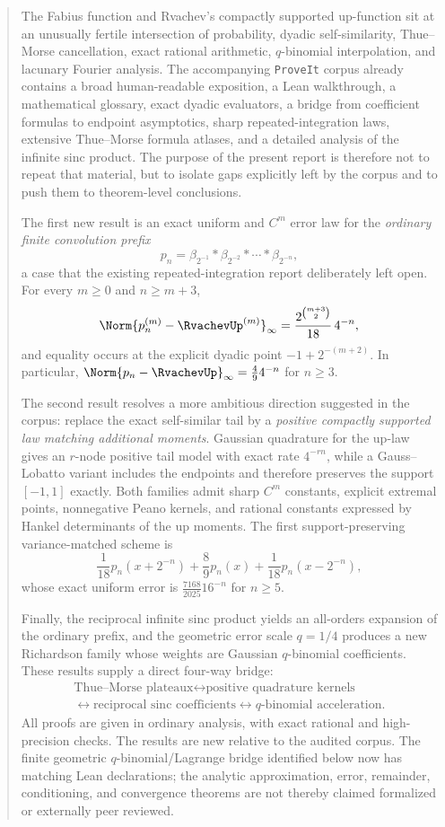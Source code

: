 \documentclass[11pt]{article}
\numberwithin{equation}{section}
\theoremstyle{definition}
\theoremstyle{remark}
\begin{document}
\begin{abstract}
The Fabius function and Rvachev's compactly supported up-function sit at an unusually fertile intersection of probability, dyadic self-similarity, Thue--Morse cancellation, exact rational arithmetic, $q$-binomial interpolation, and lacunary Fourier analysis.  The accompanying \texttt{ProveIt} corpus already contains a broad human-readable exposition, a Lean walkthrough, a mathematical glossary, exact dyadic evaluators, a bridge from coefficient formulas to endpoint asymptotics, sharp repeated-integration laws, extensive Thue--Morse formula atlases, and a detailed analysis of the infinite sinc product.  The purpose of the present report is therefore not to repeat that material, but to isolate gaps explicitly left by the corpus and to push them to theorem-level conclusions.

The first new result is an exact uniform and $C^m$ error law for the \emph{ordinary finite convolution prefix}
\[
 p_n=\beta_{2^{-1}}*\beta_{2^{-2}}*\cdots*\beta_{2^{-n}},
\]
a case that the existing repeated-integration report deliberately left open.  For every $m\ge0$ and $n\ge m+3$,
\[
 \Norm{p_n^{(m)}-\RvachevUp^{(m)}}_\infty
 =\frac{2^{\binom{m+3}{2}}}{18}\,4^{-n},
\]
and equality occurs at the explicit dyadic point $-1+2^{-(m+2)}$.  In particular,
\(\Norm{p_n-\RvachevUp}_\infty=\frac49 4^{-n}\) for $n\ge3$.

The second result resolves a more ambitious direction suggested in the corpus: replace the exact self-similar tail by a \emph{positive compactly supported law matching additional moments}.  Gaussian quadrature for the up-law gives an $r$-node positive tail model with exact rate $4^{-rn}$, while a Gauss--Lobatto variant includes the endpoints and therefore preserves the support $[-1,1]$ exactly.  Both families admit sharp $C^m$ constants, explicit extremal points, nonnegative Peano kernels, and rational constants expressed by Hankel determinants of the up moments.  The first support-preserving variance-matched scheme is
\[
 \frac1{18}p_n(x+2^{-n})+\frac89p_n(x)+\frac1{18}p_n(x-2^{-n}),
\]
whose exact uniform error is \(\frac{7168}{2025}16^{-n}\) for $n\ge5$.

Finally, the reciprocal infinite sinc product yields an all-orders expansion of the ordinary prefix, and the geometric error scale $q=1/4$ produces a new Richardson family whose weights are Gaussian $q$-binomial coefficients.  These results supply a direct four-way bridge:
\[
\begin{gathered}
\text{Thue--Morse plateaux}
\longleftrightarrow
\text{positive quadrature kernels}\\
\longleftrightarrow
\text{reciprocal sinc coefficients}
\longleftrightarrow
q\text{-binomial acceleration}.
\end{gathered}
\]
All proofs are given in ordinary analysis, with exact rational and high-precision checks.  The results are new relative to the audited corpus.  The finite geometric \(q\)-binomial/Lagrange bridge identified below now has matching Lean declarations; the analytic approximation, error, remainder, conditioning, and convergence theorems are not thereby claimed formalized or externally peer reviewed.
\end{abstract}
\end{document}
